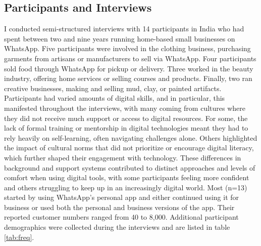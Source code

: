 \subsection{Participants and Interviews}

I conducted semi-structured interviews with 14 participants in India who had spent between two and nine years running home-based small businesses on WhatsApp. Five participants were involved in the clothing business, purchasing garments from artisans or manufacturers to sell via WhatsApp. Four participants sold food through WhatsApp for pickup or delivery. Three worked in the beauty industry, offering home services or selling courses and products. Finally, two ran creative businesses, making and selling mud, clay, or painted artifacts. Participants had varied amounts of digital skills, and in particular, this manifested throughout the interviews, with many coming from cultures where they did not receive much support or access to digital resources. For some, the lack of formal training or mentorship in digital technologies meant they had to rely heavily on self-learning, often navigating challenges alone. Others highlighted the impact of cultural norms that did not prioritize or encourage digital literacy, which further shaped their engagement with technology. These differences in background and support systems contributed to distinct approaches and levels of comfort when using digital tools, with some participants feeling more confident and others struggling to keep up in an increasingly digital world. Most (n=13) started by using WhatsApp’s personal app and either continued using it for business or used both the personal and business versions of the app. Their reported customer numbers ranged from 40 to 8,000. Additional participant demographics were collected during the interviews and are listed in table \ref{tab:freq}.

